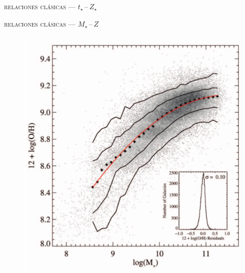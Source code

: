 \documentclass[xcolor=dvipsnames,fleqn,hyperref={colorlinks,citecolor=black,linkcolor=black,urlcolor=black}]{beamer}
\begin{document}
\begin{frame}{\textsc{relaciones clásicas --- $t_\star\,$--$\,Z_\star$}}

\end{frame}

\begin{frame}{\textsc{relaciones clásicas --- $M_\star\,$--$\,Z$}}

\begin{columns}
\begin{figure}
\includegraphics[scale=0.7]{img/tremonti2004-6}
\end{figure}
\end{columns}
\end{frame}
\end{document}

